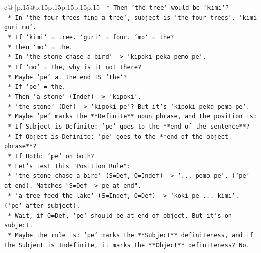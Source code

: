 \documentclass{article}
\begin{document}
{\begin{supertabular}{c@{$\;$}|p{.15\linewidth}@{}p{.15\linewidth}p{.15\linewidth}p{.15\linewidth}p{.15\linewidth}p{.15\linewidth}}
{{{\texttt{                                *   Then `the tree` would be `kimi`?} \\
\texttt{                                *   In `the four trees find a tree`, subject is `the four trees`. `kimi guri mo`.} \\
\texttt{                                *   If `kimi` = tree. `guri` = four. `mo` = the?} \\
\texttt{                                *   Then `mo` = the.} \\
\texttt{                                *   In `the stone chase a bird` {-}> `kipoki peka pemo pe`.} \\
\texttt{                                *   If `mo` = the, why is it not there?} \\
\texttt{                                *   Maybe `pe` at the end IS `the`?} \\
\texttt{                                *   If `pe` = the.} \\
\texttt{                                *   Then `a stone` (Indef) {-}> `kipoki`.} \\
\texttt{                                *   `the stone` (Def) {-}> `kipoki pe`? But it's `kipoki peka pemo pe`.} \\
\texttt{                                *   Maybe `pe` marks the **Definite** noun phrase, and the position is:} \\
\texttt{                                    *   If Subject is Definite: `pe` goes to the **end of the sentence**?} \\
\texttt{                                    *   If Object is Definite: `pe` goes to the **end of the object phrase**?} \\
\texttt{                                    *   If Both: `pe` on both?} \\
\texttt{                                *   Let's test this "Position Rule":} \\
\texttt{                                    *   `the stone chase a bird` (S=Def, O=Indef) {-}> `... pemo pe`. (`pe` at end). Matches "S=Def {-}> pe at end".} \\
\texttt{                                    *   `a tree feed the lake` (S=Indef, O=Def) {-}> `koki pe ... kimi`. (`pe` after subject).} \\
\texttt{                                        *   Wait, if O=Def, `pe` should be at end of object. But it's on subject.} \\
\texttt{                                        *   Maybe the rule is: `pe` marks the **Subject** definiteness, and if the Subject is Indefinite, it marks the **Object** definiteness? No.} \\
}}}
\end{supertabular}}
\end{document}
